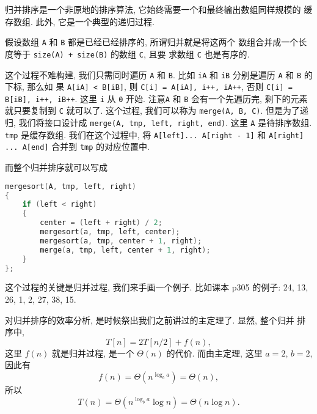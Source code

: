 \documentclass[a4paper]{ctexart}
\theoremstyle{definition}
\theoremstyle{definition}
\begin{document}

归并排序是一个非原地的排序算法, 它始终需要一个和最终输出数组同样规模的
缓存数组. 此外, 它是一个典型的递归过程.

假设数组 \verb|A| 和 \verb|B| 都是已经已经排序的, 所谓归并就是将这两个
数组合并成一个长度等于 \verb|size(A) + size(B)| 的数组 \verb|C|, 且要
求数组 \verb|C| 也是有序的.

这个过程不难构建, 我们只需同时遍历 \verb|A| 和 \verb|B|. 比如
\verb|iA| 和 \verb|iB| 分别是遍历 \verb|A| 和 \verb|B| 的下标, 那么如
果 \verb|A[iA] < B[iB]|, 则\newline
\verb|C[i] = A[iA], i++, iA++|, \newline
否则 \newline
\verb|C[i] = B[iB], i++, iB++|. \newline
这里 \verb|i| 从 \verb|0| 开始. 注意\verb|A| 和 \verb|B| 会有一个先遍历完,
剩下的元素就只要复制到 \verb|C| 就可以了. 这个过程, 我们可以称为\newline
\verb|merge(A, B, C)|. \newline
但是为了递归, 我们将接口设计成\newline
\verb|merge(A, tmp, left, right, end)|. \newline
这里 \verb|A| 是待排序数组. \verb|tmp| 是缓存数组. 我们在这个过程中, 将\newline
\verb|A[left]... A[right - 1]| \newline
和
\newline \verb|A[right] ... A[end]| \newline
合并到 \verb|tmp| 的对应位置中.

而整个归并排序就可以写成

\begin{lstlisting}[language=C++]
mergesort(A, tmp, left, right)
{
	if (left < right)
	{
		center = (left + right) / 2;
		mergesort(a, tmp, left, center);
		mergesort(a, tmp, center + 1, right);
		merge(a, tmp, left, center + 1, right);
	}
};
\end{lstlisting}

这个过程的关键是归并过程, 我们来手画一个例子. 比如课本 p305 的例子:
24, 13, 26, 1, 2, 27, 38, 15.

对归并排序的效率分析, 是时候祭出我们之前讲过的主定理了. 显然, 整个归并
排序中,
$$
T[n] = 2 T[n / 2] + f(n),
$$
这里 $f(n)$ 就是归并过程, 是一个 $\Theta(n)$ 的代价. 而由主定理, 这里
$a = 2$, $b = 2$, 因此有
$$
f(n) = \Theta(n^{\log_ba}) = \Theta(n),
$$
所以
$$
T(n) = \Theta(n^{\log_ba}\log n) = \Theta(n \log n).
$$
\end{document}
